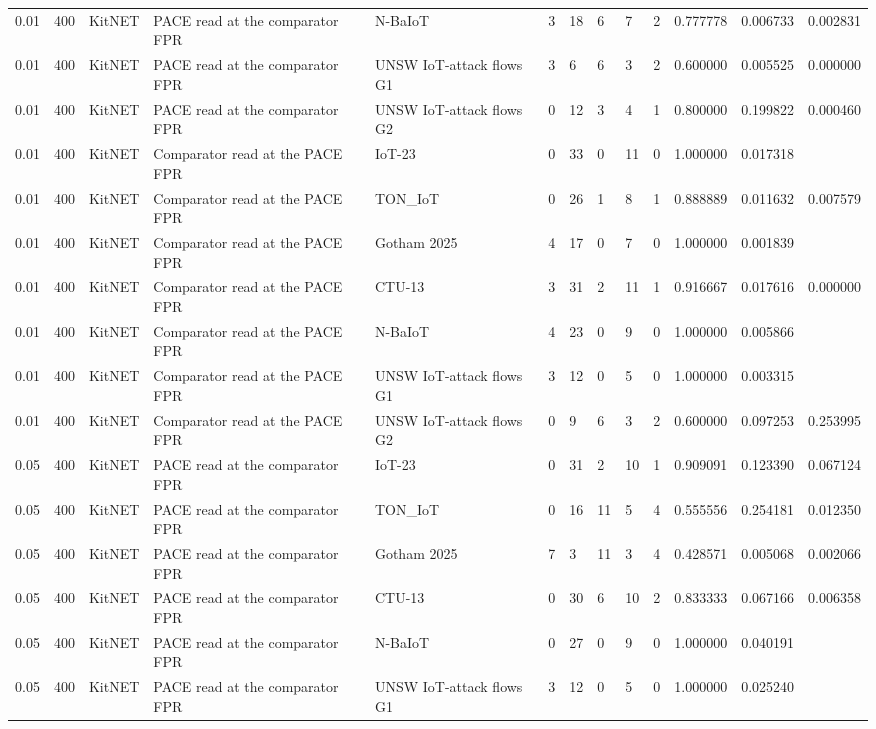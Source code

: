 \begin{tabular}{lllllllllllll}
0.01 & 400 & KitNET & PACE read at the comparator FPR & N-BaIoT & 3 & 18 & 6 & 7 & 2 & 0.777778 & 0.006733 & 0.002831 \\
0.01 & 400 & KitNET & PACE read at the comparator FPR & UNSW IoT-attack flows G1 & 3 & 6 & 6 & 3 & 2 & 0.600000 & 0.005525 & 0.000000 \\
0.01 & 400 & KitNET & PACE read at the comparator FPR & UNSW IoT-attack flows G2 & 0 & 12 & 3 & 4 & 1 & 0.800000 & 0.199822 & 0.000460 \\
0.01 & 400 & KitNET & Comparator read at the PACE FPR & IoT-23 & 0 & 33 & 0 & 11 & 0 & 1.000000 & 0.017318 &  \\
0.01 & 400 & KitNET & Comparator read at the PACE FPR & TON\_IoT & 0 & 26 & 1 & 8 & 1 & 0.888889 & 0.011632 & 0.007579 \\
0.01 & 400 & KitNET & Comparator read at the PACE FPR & Gotham 2025 & 4 & 17 & 0 & 7 & 0 & 1.000000 & 0.001839 &  \\
0.01 & 400 & KitNET & Comparator read at the PACE FPR & CTU-13 & 3 & 31 & 2 & 11 & 1 & 0.916667 & 0.017616 & 0.000000 \\
0.01 & 400 & KitNET & Comparator read at the PACE FPR & N-BaIoT & 4 & 23 & 0 & 9 & 0 & 1.000000 & 0.005866 &  \\
0.01 & 400 & KitNET & Comparator read at the PACE FPR & UNSW IoT-attack flows G1 & 3 & 12 & 0 & 5 & 0 & 1.000000 & 0.003315 &  \\
0.01 & 400 & KitNET & Comparator read at the PACE FPR & UNSW IoT-attack flows G2 & 0 & 9 & 6 & 3 & 2 & 0.600000 & 0.097253 & 0.253995 \\
0.05 & 400 & KitNET & PACE read at the comparator FPR & IoT-23 & 0 & 31 & 2 & 10 & 1 & 0.909091 & 0.123390 & 0.067124 \\
0.05 & 400 & KitNET & PACE read at the comparator FPR & TON\_IoT & 0 & 16 & 11 & 5 & 4 & 0.555556 & 0.254181 & 0.012350 \\
0.05 & 400 & KitNET & PACE read at the comparator FPR & Gotham 2025 & 7 & 3 & 11 & 3 & 4 & 0.428571 & 0.005068 & 0.002066 \\
0.05 & 400 & KitNET & PACE read at the comparator FPR & CTU-13 & 0 & 30 & 6 & 10 & 2 & 0.833333 & 0.067166 & 0.006358 \\
0.05 & 400 & KitNET & PACE read at the comparator FPR & N-BaIoT & 0 & 27 & 0 & 9 & 0 & 1.000000 & 0.040191 &  \\
0.05 & 400 & KitNET & PACE read at the comparator FPR & UNSW IoT-attack flows G1 & 3 & 12 & 0 & 5 & 0 & 1.000000 & 0.025240 &  \\

\end{tabular}
